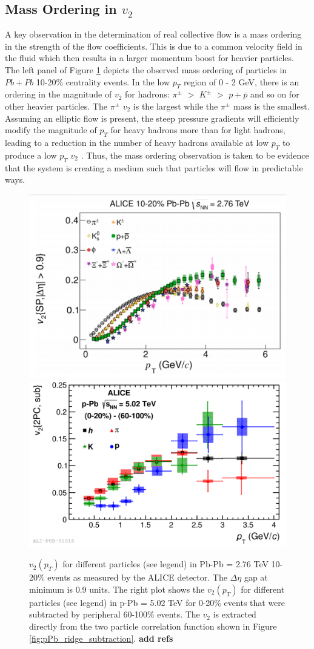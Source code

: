 \subsection{Mass Ordering in $v_2$}
A key observation in the determination of real collective flow is a mass ordering in the strength of the flow coefficients. This is due to a common velocity field in the fluid which then results in a larger momentum boost for heavier particles. The left panel of Figure \ref{fig:PbpPb_mass_ordering} depicts the observed mass ordering of particles in $Pb+Pb$ 10-20\% centrality events. In the low $p_T$ region of 0 - 2 GeV, there is an ordering in the magnitude of $v_2$ for hadrons: $\pi^{\pm}$ $>$ $K^{\pm}$ $>$ $p+\overline{p}$ and so on for other heavier particles. The $\pi^{\pm}$ $v_2$ is the largest while the $\pi^{\pm}$ mass is the smallest. Assuming an elliptic flow is present, the steep pressure gradients will efficiently modify the magnitude of $p_T$ for heavy hadrons more than for light hadrons, leading to a reduction in the number of heavy hadrons available at low $p_T$ to produce a low $p_T$ $v_2$ \cite{PhysRevC.77.044909}. Thus, the mass ordering observation is taken to be evidence that the system is creating a medium such that particles will flow in predictable ways.

\begin{figure}[h!]
\begin{center}
\includegraphics[width=0.48\linewidth]{figs/PbPb_v2_mass_ordering.PNG}
\includegraphics[width=0.48\linewidth]{figs/pPb_two_part_v2_mass_ordering.PNG}
\caption{$v_2(p_T)$ for different particles (see legend) in Pb-Pb \sqsn = 2.76 TeV 10-20\% events as measured by the ALICE detector. The $\Delta\eta$ gap at minimum is 0.9 units. The right plot shows the $v_2(p_T)$ for different particles (see legend) in p-Pb \sqsn = 5.02 TeV for 0-20\% events that were subtracted by peripheral 60-100\% events. The $v_2$ is extracted directly from the two particle correlation function shown in Figure \ref{fig:pPb_ridge_subtraction}. \textbf{add refs}}
\label{fig:PbpPb_mass_ordering}
\end{center}
\end{figure}

